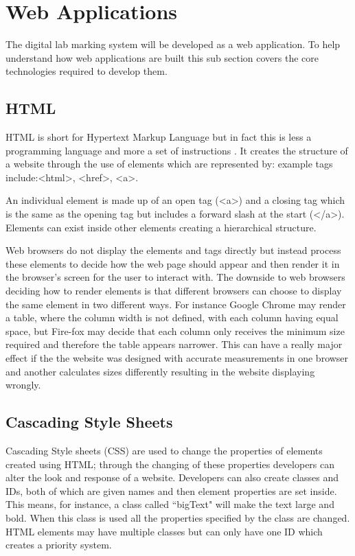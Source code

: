 \documentclass[11pt]{report}
\newcommand{\tag}[1]{\textless {#1}\textgreater}
\begin{document}
\section{Web Applications}

The digital lab marking system will be developed as a web application. To help understand how web applications are built this sub section covers the core technologies required to develop them.

\subsection{HTML}
HTML is short for Hypertext Markup Language but in fact this is less a programming language and more a set of instructions \cite{brooks_introduction_2007}. It creates the structure of a website through the use of elements which are represented by: example tags include:\tag{html}, \tag{href}, \tag{a}. 

An individual element is made up of an open tag (\tag{a}) and a closing tag which is the same as the opening tag but includes a forward slash at the start (\tag{/a}). Elements can exist inside other elements creating a hierarchical structure.

Web browsers do not display the elements and tags directly \cite{w3_introduction_????} but instead process these elements to decide how the web page should appear and then render it in the browser's screen for the user to interact with. The downside to web browsers deciding how to render elements is that different browsers can choose to display the same element in two different ways. For instance Google Chrome may render a table, where the column width is not defined, with each column having equal space, but Fire-fox  may decide that each column only receives the minimum size required and therefore the table appears narrower. This can have a really major effect if the the website was designed with accurate measurements in one browser and another calculates sizes differently resulting in the website displaying wrongly.    


\subsection{Cascading Style Sheets}
Cascading Style sheets (CSS)\cite{lie_cascading_2005} are used to change the properties of elements created using HTML; through the changing of these properties developers can alter the look and response of a website. Developers can also create classes and IDs, both of which are given names and then element properties are set inside. This means, for instance, a class called ``bigText" will make the text large and bold. When this class is used all the properties specified by the class are changed. HTML elements may have multiple classes but can only have one ID which creates a priority system. 
\end{document}
